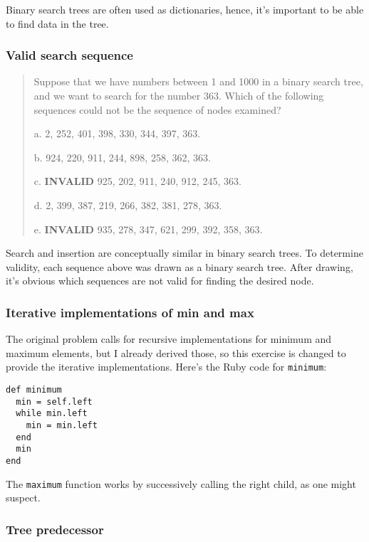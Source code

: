 \documentclass{article}
\begin{document}
Binary search trees are often used as dictionaries, hence, it's important
to be able to find data in the tree.

\subsubsection{Valid search sequence}

\begin{quote}
Suppose that we have numbers between 1 and 1000 in a binary search tree, and we
want to search for the number 363. Which of the following sequences could not be
the sequence of nodes examined?

a. 2, 252, 401, 398, 330, 344, 397, 363.

b. 924, 220, 911, 244, 898, 258, 362, 363.

c. \textbf{INVALID} 925, 202, 911, 240, 912, 245, 363.

d. 2, 399, 387, 219, 266, 382, 381, 278, 363.

e. \textbf{INVALID} 935, 278, 347, 621, 299, 392, 358, 363.
\end{quote}

Search and insertion are conceptually similar in binary search
trees. To determine validity, each sequence above was drawn as
a binary search tree. After drawing, it's obvious which sequences
are not valid for finding the desired node.




\subsubsection{Iterative implementations of min and max}

The original problem calls for recursive implementations for minimum
and maximum elements, but I already derived those, so this exercise
is changed to provide the iterative implementations. Here's the
Ruby code for \texttt{minimum}:

\begin{lstlisting}[frame=single]
def minimum
  min = self.left
  while min.left
    min = min.left
  end
  min
end
\end{lstlisting}

The \texttt{maximum} function works by successively calling the right
child, as one might suspect.

\subsubsection{Tree predecessor}
\end{document}
